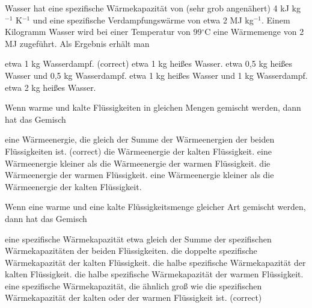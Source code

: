 \documentclass[11pt]{exam}
\begin{document}
\setlength{\voffset}{-0.5in}
\setlength{\headsep}{5pt}

\hspace{2mm}
 \hspace{5mm}
\vspace{4mm}

\begin{questions}

\question Wasser hat eine spezifische Wärmekapazität von (sehr grob angenähert) 4 kJ kg\(^{-1}\) K\(^{-1}\) und eine spezifische Verdampfungswärme von etwa 2 MJ kg\(^{-1}\). Einem Kilogramm Wasser wird bei einer Temperatur von 99\(^\circ\)C eine Wärmemenge von 2 MJ zugeführt. Als Ergebnis erhält man

\begin{choices}
	\choice etwa 1 kg Wasserdampf. (correct)
	\choice etwa 1 kg heißes Wasser.
	\choice etwa 0,5 kg heißes Wasser und 0,5 kg Wasserdampf.
	\choice etwa 1 kg heißes Wasser und 1 kg Wasserdampf.
	\choice etwa 2 kg heißes Wasser.
\end{choices}

\vspace{3mm}\question Wenn warme und kalte Flüssigkeiten in gleichen Mengen gemischt werden, dann hat das Gemisch

\begin{choices}
	\choice eine Wärmeenergie, die gleich der Summe der Wärmeenergien der beiden Flüssigkeiten ist. (correct)
	\choice die Wärmeenergie der kalten Flüssigkeit.
	\choice eine Wärmeenergie kleiner als die Wärmeenergie der warmen Flüssigkeit.
	\choice die Wärmeenergie der warmen Flüssigkeit.
	\choice eine Wärmeenergie kleiner als die Wärmeenergie der kalten Flüssigkeit.
\end{choices}

\vspace{3mm}\question Wenn eine warme und eine kalte Flüssigkeitsmenge gleicher Art gemischt werden, dann hat das Gemisch

\begin{choices}
	\choice eine spezifische Wärmekapazität etwa gleich der Summe der spezifischen Wärmekapazitäten der beiden Flüssigkeiten.
	\choice die doppelte spezifische Wärmekapazität der kalten Flüssigkeit.
	\choice die halbe spezifische Wärmekapazität der kalten Flüssigkeit.
	\choice die halbe spezifische Wärmekapazität der warmen Flüssigkeit.
	\choice eine spezifische Wärmekapazität, die ähnlich groß wie die spezifischen Wärmekapazität der kalten oder der warmen Flüssigkeit ist. (correct)
\end{choices}


\end{questions}
\end{document}
